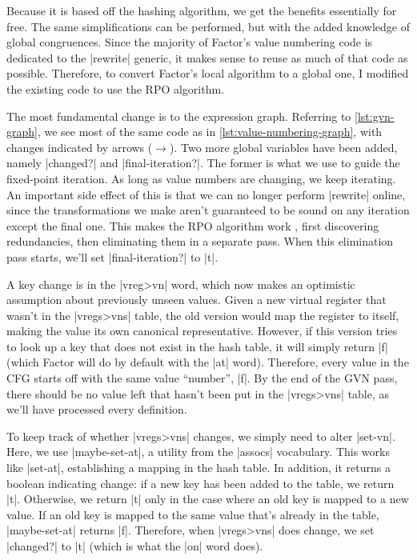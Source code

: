 Because it is based off the hashing algorithm, we get the benefits essentially
for free.  The same simplifications can be performed, but with the added
knowledge of global congruences.  Since the majority of Factor's value
numbering code is dedicated to the \factor|rewrite| generic, it makes sense to
reuse as much of that code as possible.  Therefore, to convert Factor's local
algorithm to a global one, I modified the existing code to use the \gls{RPO}
algorithm.


The most fundamental change is to the expression graph.  Referring to
\vref{lst:gvn-graph}, we see most of the same code as in
\vref{lst:value-numbering-graph}, with changes indicated by arrows
($\longrightarrow$).  Two more global variables have been added, namely
\factor|changed?| and \factor|final-iteration?|.  The former is what we use to
guide the fixed-point iteration.  As long as value numbers are changing, we
keep iterating.  An important side effect of this is that we can no longer
perform \factor|rewrite| online, since the transformations we make aren't
guaranteed to be sound on any iteration except the final one.  This makes the
\gls{RPO} algorithm work , first discovering redundancies, then
eliminating them in a separate pass.  When this elimination pass starts, we'll
set \factor|final-iteration?| to \factor|t|.

A key change is in the \factor|vreg>vn| word, which now makes an optimistic
assumption about previously unseen values.  Given a new virtual register that
wasn't in the \factor|vregs>vns| table, the old version would map the register
to itself, making the value its own canonical representative.  However, if this
version tries to look up a key that does not exist in the hash table, it will
simply return \factor|f| (which Factor will do by default with the \factor|at|
word).  Therefore, every value in the \gls{CFG} starts off with the same value
``number'', \factor|f|.  By the end of the \gls{GVN} pass, there should be no
value left that hasn't been put in the \factor|vregs>vns| table, as we'll have
processed every definition.

To keep track of whether \factor|vregs>vns| changes, we simply need to alter
\factor|set-vn|.  Here, we use \factor|maybe-set-at|, a utility from the
\factor|assocs| vocabulary.  This works like \factor|set-at|, establishing a
mapping in the hash table.  In addition, it returns a boolean indicating
change: if a new key has been added to the table, we return \factor|t|.
Otherwise, we return \factor|t| only in the case where an old key is mapped to
a new value.  If an old key is mapped to the same value that's already in the
table, \factor|maybe-set-at| returns \factor|f|.  Therefore, when
\factor|vregs>vns| does change, we set \factor|changed?| to \factor|t| (which
is what the \factor|on| word does).

